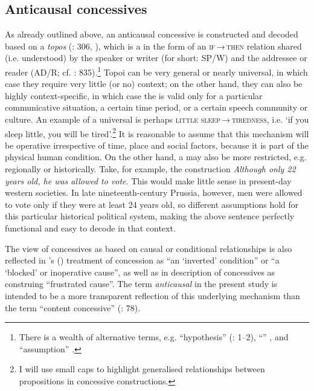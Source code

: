 \subsection{Anticausal concessives}\label{sec:2.2.1}\label{bkm:Ref470953076}\label{bkm:Ref487191503}\label{bkm:Ref490761556}\label{bkm:Ref496799325}\label{bkm:Ref81906278}\label{bkm:Ref118500084}

As already outlined above, an anticausal concessive is constructed and decoded based on a \textit{topos} (\citealt{Azar1997}: 306, \citealt{Anscombre1989}), which is a  in the form of an \textsc{if}\,→\,\textsc{then} relation shared (i.e. understood) by the speaker or writer (for short: SP/W) and the addressee or reader (AD/R; cf. \citealt{König2006,Givón1990}: 835).\footnote{There is a wealth of alternative terms, e.g. “hypothesis” (\citealt{Burnham1911}: 1–2), “” \citep{König1991a}, and “assumption” \citep{König2006}.} Topoi can be very general or nearly universal, in which case they require very little (or no) context; on the other hand, they can also be highly context-specific, in which case the  is valid only for a particular communicative situation, a certain time period, or a certain speech community or culture. An example of a universal  is perhaps \textsc{little sleep}\,→\,\textsc{tiredness}, i.e. ‘if you sleep little, you will be tired’.\footnote{I will use small caps to highlight generalised relationships between propositions in concessive constructions.} It is reasonable to assume that this mechanism will be operative irrespective of time, place and social factors, because it is part of the physical human condition. On the other hand, a  may also be more restricted, e.g. regionally or historically. Take, for example, the construction \textit{Although only 22 years old, he was allowed to vote}. This would make little sense in present-day western societies. In late nineteenth-century Prussia, however, men were allowed to vote only if they were at least 24 years old, so different assumptions hold for this particular historical political system, making the above sentence perfectly functional and easy to decode in that context.

The view of concessives as based on causal or conditional relationships is also reflected in \citeauthor{QuirkEtAl1985}’s (\citeyear[484]{QuirkEtAl1985}) treatment of concession as “an ‘inverted’ condition” or “a ‘blocked’ or inoperative cause”, as well as in  description of concessives as construing “frustrated cause”. The term \textit{anticausal} in the present study is intended to be a more transparent reflection of this underlying mechanism than the term “content concessive” (\citealt{Sweetser1990,Crevels2000,Hilpert2013a}: 78).

